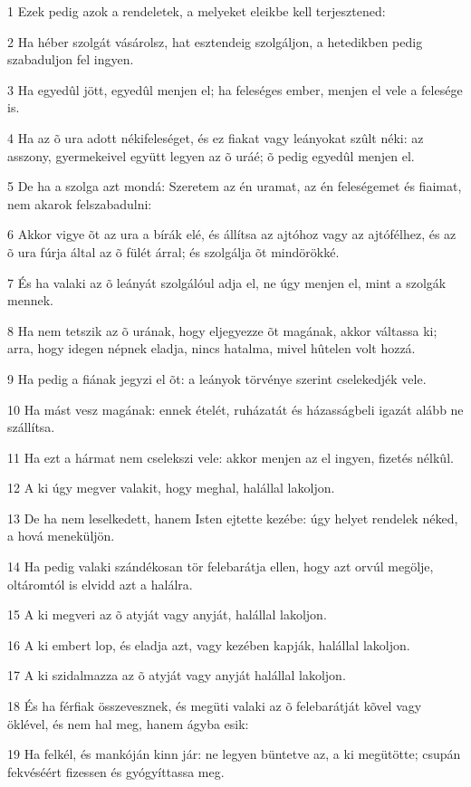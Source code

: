 \par 1 Ezek pedig azok a rendeletek, a melyeket eleikbe kell terjesztened:
\par 2 Ha héber szolgát vásárolsz, hat esztendeig szolgáljon, a hetedikben pedig szabaduljon fel ingyen.
\par 3 Ha egyedûl jött, egyedûl menjen el; ha feleséges ember, menjen el vele a felesége is.
\par 4 Ha az õ ura adott nékifeleséget, és ez fiakat vagy leányokat szûlt néki: az asszony, gyermekeivel együtt legyen az õ uráé; õ pedig egyedûl menjen el.
\par 5 De ha a szolga azt mondá: Szeretem az én uramat, az én feleségemet és fiaimat, nem akarok felszabadulni:
\par 6 Akkor vigye õt az ura a bírák elé, és állítsa az ajtóhoz vagy az ajtófélhez, és az õ ura fúrja által az õ fülét árral; és szolgálja õt mindörökké.
\par 7 És ha valaki az õ leányát szolgálóul adja el, ne úgy menjen el, mint a szolgák mennek.
\par 8 Ha nem tetszik az õ urának, hogy eljegyezze õt magának, akkor váltassa ki; arra, hogy idegen népnek eladja, nincs hatalma, mivel hûtelen volt hozzá.
\par 9 Ha pedig a fiának jegyzi el õt: a leányok törvénye szerint cselekedjék vele.
\par 10 Ha mást vesz magának: ennek ételét, ruházatát és házasságbeli igazát alább ne szállítsa.
\par 11 Ha ezt a hármat nem cselekszi vele: akkor menjen az el ingyen, fizetés nélkûl.
\par 12 A ki úgy megver valakit, hogy meghal, halállal lakoljon.
\par 13 De ha nem leselkedett, hanem Isten ejtette kezébe: úgy helyet rendelek néked, a hová meneküljön.
\par 14 Ha pedig valaki szándékosan tör felebarátja ellen, hogy azt orvúl megölje, oltáromtól is elvidd azt a halálra.
\par 15 A ki megveri az õ atyját vagy anyját, halállal lakoljon.
\par 16 A ki embert lop, és eladja azt, vagy kezében kapják, halállal lakoljon.
\par 17 A ki szidalmazza az õ atyját vagy anyját halállal lakoljon.
\par 18 És ha férfiak összevesznek, és megüti valaki az õ felebarátját kõvel vagy öklével, és nem hal meg, hanem ágyba esik:
\par 19 Ha felkél, és mankóján kinn jár: ne legyen büntetve az, a ki megütötte; csupán fekvéséért fizessen és gyógyíttassa meg.
